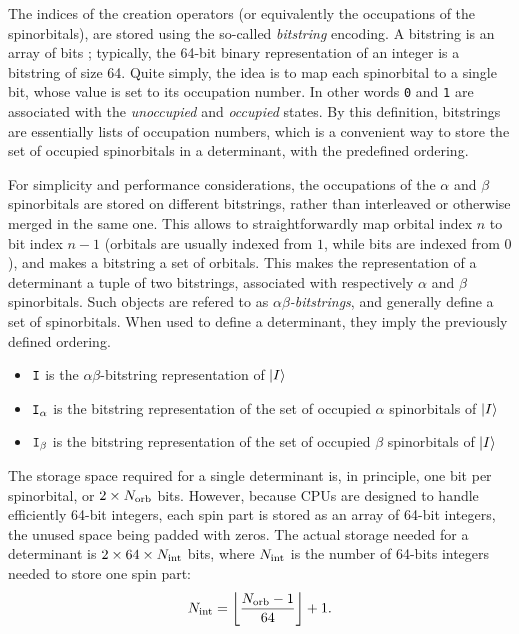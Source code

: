 \documentclass[./thesis.tex]{subfiles}
\begin{document}
The indices of the creation operators (or equivalently the
occupations of the spinorbitals), are stored using the so-called \emph{bitstring} encoding. A bitstring is an array of bits ; typically, the 64-bit binary representation of an integer is a bitstring of size 64.
Quite simply, the idea is to map each spinorbital to a single bit, whose value is set to its occupation number. In other words \texttt{0} and \texttt{1} are associated with the \emph{unoccupied} and \emph{occupied} states.
By this definition, bitstrings are essentially lists of occupation numbers, which is a convenient way to
store the set of occupied spinorbitals in a determinant, with the predefined ordering.

For simplicity and performance considerations, the occupations of the $\alpha$ and $\beta$ spinorbitals are stored on different bitstrings, rather than interleaved or otherwise merged in the same one. This allows to straightforwardly map orbital index $n$ to bit index $n-1$ (orbitals are usually indexed from $1$, while bits are indexed from $0$), and makes a bitstring a set of orbitals.
This makes the representation of a determinant a tuple of two bitstrings, associated with respectively $\alpha$ and $\beta$ spinorbitals. Such objects are refered to as \emph{$\alpha \beta$-bitstrings}, and generally define a set of spinorbitals. When used to define a determinant, they imply the previously defined ordering.


\begin{itemize}
\item
${\texttt{I}}$ is the $\alpha \beta$-bitstring representation of ${\ket{I}}$
\item
${\texttt{I}}_\alpha$ is the bitstring representation of the set of occupied $\alpha$ spinorbitals of ${\ket{I}}$ 
\item
${\texttt{I}}_\beta$ is the bitstring representation of the set of occupied $\beta$ spinorbitals of ${\ket{I}}$ 

\end{itemize}


The storage space required for a single determinant is, in principle, one bit per spinorbital, or $2 \times {N_\text{orb}}$ bits. However, because CPUs are designed to handle efficiently 64-bit integers, each spin part is stored as an array of 64-bit integers, the unused space being padded with zeros. 
The actual storage needed for a determinant is $2 \times 64 \times {N_\text{int}}$ bits, where ${N_\text{int}}$ is the number of 64-bits integers needed to store one spin part:
\begin{equation}
{N_\text{int}} = \left \lfloor \frac{{N_\text{orb}}-1}{64} \right \rfloor + 1.
\end{equation}
\end{document}

